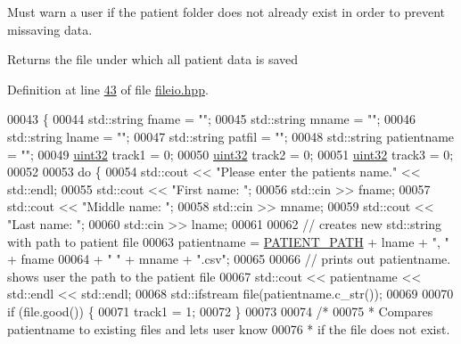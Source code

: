 Must warn a user if the patient folder does not already exist in order to prevent missaving data.

\begin{DoxyReturn}{Returns}
the file under which all patient data is saved 
\end{DoxyReturn}


Definition at line \hyperlink{fileio_8hpp_source_l00043}{43} of file \hyperlink{fileio_8hpp_source}{fileio.\+hpp}.


\begin{DoxyCode}
00043                             \{
00044         std::string fname = \textcolor{stringliteral}{""};
00045         std::string mname = \textcolor{stringliteral}{""};
00046         std::string lname = \textcolor{stringliteral}{""};
00047         std::string patfil = \textcolor{stringliteral}{""};
00048         std::string patientname = \textcolor{stringliteral}{""};
00049         \hyperlink{definitions_8hpp_a1134b580f8da4de94ca6b1de4d37975e}{uint32} track1 = 0;
00050         \hyperlink{definitions_8hpp_a1134b580f8da4de94ca6b1de4d37975e}{uint32} track2 = 0;
00051         \hyperlink{definitions_8hpp_a1134b580f8da4de94ca6b1de4d37975e}{uint32} track3 = 0;
00052 
00053         \textcolor{keywordflow}{do} \{
00054             std::cout << \textcolor{stringliteral}{"Please enter the patients name."} << std::endl;
00055             std::cout << \textcolor{stringliteral}{"First name: "};
00056             std::cin >> fname;
00057             std::cout << \textcolor{stringliteral}{"Middle name: "};
00058             std::cin >> mname;
00059             std::cout << \textcolor{stringliteral}{"Last name: "};
00060             std::cin >> lname;
00061 
00062             \textcolor{comment}{// creates new std::string with path to patient file}
00063             patientname = \hyperlink{namespacevaso_a0f49c8240a13e7d853912ad78d5f53c9}{PATIENT\_PATH} + lname + \textcolor{stringliteral}{", "} + fname
00064                 + \textcolor{stringliteral}{" "} + mname + \textcolor{stringliteral}{".csv"};
00065 
00066             \textcolor{comment}{// prints out patientname. shows user the path to the patient file}
00067             std::cout << patientname << std::endl << std::endl;
00068             std::ifstream file(patientname.c\_str());
00069 
00070             \textcolor{keywordflow}{if} (file.good()) \{
00071                 track1 = 1;
00072             \}
00073 
00074             \textcolor{comment}{/*}
00075 \textcolor{comment}{             * Compares patientname to existing files and lets user know}
00076 \textcolor{comment}{             * if the file does not exist.}

\end{DoxyCode}
